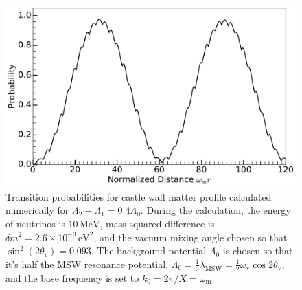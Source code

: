 \begin{figure}[!htbp]
        \includegraphics[width=\columnwidth]{chapters/assets/rabi/castle-wall-1}%
    \caption{Transition probabilities for castle wall matter profile calculated numerically for $\Lambda_2-\Lambda_1=0.4 \Lambda_0$. During the calculation, the energy of neutrinos is $10\,\mathrm{MeV}$, mass-squared difference is $\delta m^2=2.6\times 10^{-3}\,\mathrm{eV^2}$, and the vacuum mixing angle chosen so that $\sin^2(2\theta_v)=0.093$. The background potential $\Lambda_0$ is chosen so that it's half the MSW resonance potential, $\Lambda_0 = \frac{1}{2}\lambda_{\mathrm{MSW}}=\frac{1}{2}\omega_{\mathrm{v}}\cos 2\theta_{\mathrm v}$, and the base frequency is set to $k_0 = 2\pi/X = \omega_{\mathrm{m}}$.
                 }
    \label{fig-akhmedovOscPlt}
\end{figure}


